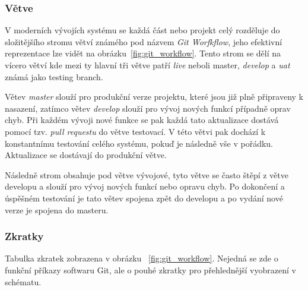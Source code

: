 \subsubsection*{Větve}
\label{subsubsec:implementation-collaboration-versioning-branches}
V moderních vývojích systému se každá část nebo projekt celý rozděluje do složitějšího stromu větví známého pod názvem \textit{Git Worfkflow}, jeho efektivní reprezentace lze vidět na obrázku~\ref{fig:git_workflow}. Tento strom se dělí na vícero větví kde mezi ty hlavní tři větve patří \textit{live} neboli master, \textit{develop} a \textit{uat} známá jako testing branch.

Větev \textit{master} slouží pro produkční verze projektu, které jsou již plně připraveny k nasazení, zatímco větev \textit{develop} slouží pro vývoj nových funkcí případně oprav chyb. Při každém vývoji nové funkce se pak každá tato aktualizace dostává pomocí tzv. \textit{pull requestu} do větve testovací. V této větvi pak dochází k konstantnímu testování celého systému, pokuď je následně vše v pořádku. Aktualizace se dostávají do produkční větve.

Následně strom obsahuje pod větve vývojové, tyto větve se často štěpí z větve developu a slouží pro vývoj nových funkcí nebo opravu chyb. Po dokončení a úspěšném testování je tato větev spojena zpět do developu a po vydání nové verze je spojena do masteru.

\subsubsection*{Zkratky}
Tabulka zkratek zobrazena v obrázku ~\ref{fig:git_workflow}. Nejedná se zde o funkční příkazy softwaru Git, ale o pouhé zkratky pro přehlednější vyobrazení v schématu.


